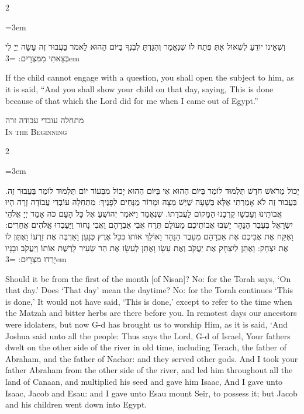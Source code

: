 \documentclass[11pt, openany]{book}
\newcommand{\sederdivider}{%
  \par\vspace{6pt}
  \begin{center}
    \textcolor{sedergold}{\pgfornament[width=1.5cm]{11}}
  \end{center}
  \par\vspace{6pt}
}
\newenvironment{bilingual}{%
  \par\vspace{4pt}%
  \begin{paracol}{2}%
}{%
  \end{paracol}%
  \par\vspace{2pt}%
}
\newenvironment{hebrewcol}{%
  \switchcolumn[1]%
  \begingroup
  \RTL
  \hebrewfont\large
  \setstretch{1.4}%
  \emergencystretch=3em
  \tolerance=9999
  \parindent=0pt\relax
}{%
  \endRTL
  \endgroup
}
\newenvironment{englishcol}{%
  \switchcolumn[0]%
  \begingroup
  \setstretch{1.4}%
  \emergencystretch=3em
  \tolerance=9999
  \normalsize
  \rightskip=0.12in\relax
}{%
  \endgroup
}
\newcommand{\subsedertitle}[2]{%
  \par\vspace{8pt}
  \begin{center}
    {\hebrewfontsanslarge\textcolor{sederblue}{\beginR #1\endR}}\\[3pt]
    {\normalsize\scshape\textcolor{sederblue}{#2}}
  \end{center}
  \par\vspace{3pt}
}
\begin{document}
\begin{bilingual}
\begin{hebrewcol}
וְשֶׁאֵינוֹ יוֹדֵעַ לִשְׁאוֹל אַתְּ פְּתַח לוֹ שֶׁנֶּאֱמַר וְהִגַּדְתָּ לְבִנְךָ בַּיּוֹם הַהוּא לֵאמֹר בַּעֲבוּר זֶה עָשָׂה יְיָ לִי בְּצֵאתִי מִמִּצְרָיִם:
\end{hebrewcol}
\begin{englishcol}
If the child cannot engage with a question, you shall open the subject to him, as it is said, ``And you shall show your child on that day, saying, This is done because of that which the Lord did for me when I came out of Egypt.''
\end{englishcol}
\end{bilingual}

\sederdivider

\subsedertitle{מתחלה עובדי עבודה זרה}{In the Beginning}

\begin{bilingual}
\begin{hebrewcol}
יָכוֹל מֵרֹאשׁ חֹדֶשׁ תַּלְמוּד לוֹמַר בַּיּוֹם הַהוּא אִי בַּיּוֹם הַהוּא יָכוֹל מִבְּעוֹד יוֹם תַּלְמוּד לוֹמַר בַּעֲבוּר זֶה. בַּעֲבוּר זֶה לֹא אָמַרְתִּי אֶלָּא בְּשָׁעָה שֶׁיֵּשׁ מַצָּה וּמָרוֹר מֻנָּחִים לְפָנֶיךָ:
מִתְּחִלָה עוֹבְדֵי עֲבוֹדָה זָרָה הָיוּ אֲבוֹתֵינוּ וְעַכְשָׁו קֵרְבָנוּ הַמָּקוֹם לַעֲבֹדָתוֹ. שֶׁנֶּאֱמַר וַיֹּאמֶר יְהוֹשֻׁעַ אֶל כָּל הָעָם כֹּה אָמַר יְיָ אֱלֹהֵי יִשְׂרָאֵל בְּעֵבֶר הַנָּהָר יָשְׁבוּ אֲבוֹתֵיכֶם מֵעוֹלָם תֶּרַח אֲבִי אַבְרָהָם וַאֲבִי נָחוֹר וַיַּעַבְדוּ אֱלֹהִים אֲחֵרִים:
וָאֶקַּח אֶת אֲבִיכֶם אֶת אַבְרָהָם מֵעֵבֶר הַנָּהָר וָאוֹלֵךְ אוֹתוֹ בְּכָל אֶרֶץ כְּנָעַן וָאַרְבֶּה אֶת זַרְעוֹ וָאֶתֶּן לוֹ אֶת יִצְחָק: וָאֶתֵּן לְיִצְחָק אֶת יַעֲקֹב וְאֶת עֵשָׂו וָאֶתֵּן לְעֵשָׂו אֶת הַר שֵׂעִיר לָרֶשֶׁת אוֹתוֹ וְיַעֲקֹב וּבָנָיו יָרְדוּ מִצְרָיִם:
\end{hebrewcol}
\begin{englishcol}
Should it be from the first of the month [of Nisan]? No: for the Torah says, `On that day.' Does `That day' mean the daytime? No: for the Torah continues `This is done,' It would not have said, `This is done,' except to refer to the time when the Matzah and bitter herbs are there before you.
In remotest days our ancestors were idolaters, but now G-d has brought us to worship Him, as it is said, `And Joshua said unto all the people: Thus says the Lord, G-d of Israel, Your fathers dwelt on the other side of the river in old time, including Terach, the father of Abraham, and the father of Nachor: and they served other gods.
And I took your father Abraham from the other side of the river, and led him throughout all the land of Canaan, and multiplied his seed and gave him Isaac, And I gave unto Isaac, Jacob and Esau: and I gave unto Esau mount Seir, to possess it; but Jacob and his children went down into Egypt.
\end{englishcol}
\end{bilingual}
\sederdivider
\end{document}
